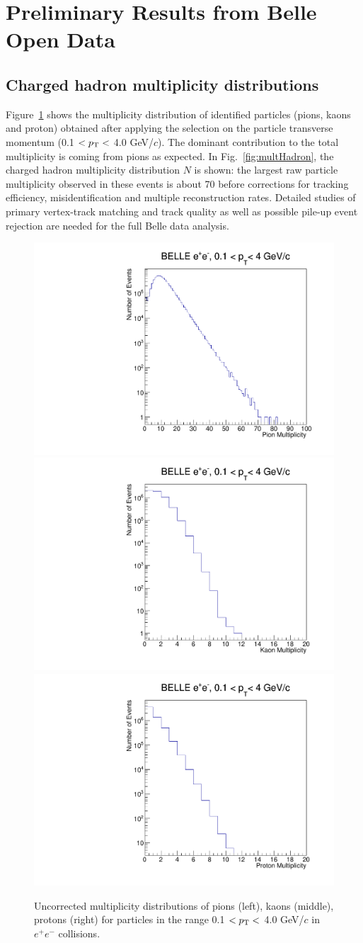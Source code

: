 \section{Preliminary Results from Belle Open Data}

\subsection{Charged hadron multiplicity distributions}

Figure~\ref{fig:multPID} shows the multiplicity distribution of identified particles (pions, kaons and proton) obtained after 
applying the selection on the particle transverse momentum (0.1 $<p_{\rm T}<$ 4.0 GeV/$c$). 
The dominant contribution to the total multiplicity is coming from pions as expected.
In Fig.~\ref{fig:multHadron}, the charged hadron multiplicity distribution $N$ is shown: the largest raw particle multiplicity observed in these events is about 70 before corrections for tracking efficiency, misidentification and multiple reconstruction rates. Detailed studies of primary vertex-track matching and track quality as well as possible pile-up event rejection are needed for the full Belle data analysis. 

\begin{figure}[!htb]
\begin{center}
\includegraphics[width=.32\textwidth]{figures/pion_mult.pdf}
\includegraphics[width=.32\textwidth]{figures/kaon_mult.pdf}
\includegraphics[width=.32\textwidth]{figures/proton_mult.pdf}
\caption{Uncorrected multiplicity distributions of pions (left), kaons (middle), protons (right) for  particles in the range  0.1 $<p_{\rm T}<$ 4.0 GeV/$c$ in $e^{+}e^{-}$ collisions. }
\label{fig:multPID} 
\end{center}
\end{figure}

